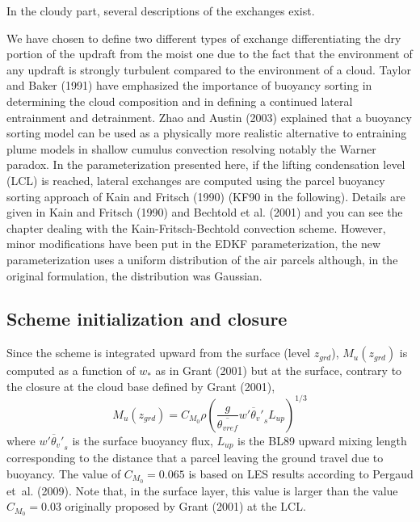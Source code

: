 In the cloudy part, several descriptions of the exchanges exist. 

We have chosen to define two different types of exchange differentiating the dry portion of the updraft from the moist one due to the fact that the environment of any updraft is strongly turbulent compared to the environment of a cloud. 
Taylor and Baker (1991) have emphasized the importance of buoyancy sorting in determining the cloud composition and in defining a continued lateral entrainment and detrainment. Zhao and Austin (2003) explained that a buoyancy sorting model can be used as a physically more realistic alternative to entraining plume models in shallow cumulus convection resolving notably the Warner paradox. In the parameterization presented here, if the lifting condensation level (LCL) is reached, lateral exchanges are computed using the parcel buoyancy sorting approach of Kain and Fritsch (1990) (KF90 in the following). Details are given in Kain and Fritsch (1990) and Bechtold et al. (2001) and you can see the chapter dealing with the Kain-Fritsch-Bechtold convection scheme.
However, minor modifications have been put in the EDKF parameterization, the new parameterization uses a uniform distribution of the air parcels although, in the original formulation, the distribution was Gaussian. 

\subsection{Scheme initialization and closure}

Since the scheme is integrated upward from the surface (level $z_{grd}$), $M_u(z_{grd})$ is computed as a function of $w_*$ as in Grant (2001) but at the surface, contrary to the closure at the cloud base defined by Grant (2001),
\begin{equation}
M_{u}(z_{grd})=C_{M_0}\rho(\frac{g}{\overline{\theta_{vref}}}\overline{{w'\theta_{v}'}_s} L_{up})^{1/3}
\label{eq:MFz0}
\end{equation}
where $\overline{{w'\theta_{v}'}_s}$ is the surface buoyancy flux, ${L_{up}}$ is the BL89 upward mixing length corresponding to the distance that a parcel leaving the ground travel due to buoyancy. The value of $C_{M_0}=0.065$ is based on LES results according to Pergaud et~al. (2009). Note that, in the surface layer, this value is larger than the value $C_{M_0}=0.03$ originally proposed by Grant (2001) at the LCL. 

